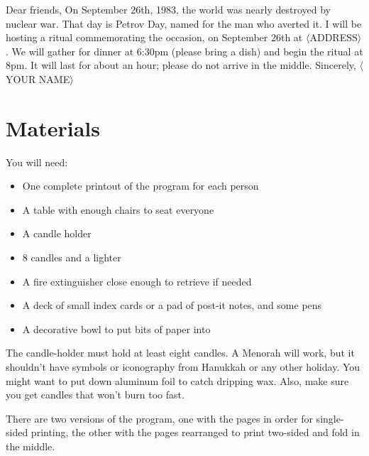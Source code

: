 \documentclass{article}
\begin{document}
\begin{center}
	\parbox{4.5in}{
	Dear friends,\newline
	On September 26th, 1983, the world was nearly destroyed by nuclear war.
	That day is Petrov Day, named for the man who averted it. I will be hosting
	a ritual commemorating the occasion, on September 26th at $\langle$ADDRESS$\rangle$. We
	will gather for dinner at 6:30pm (please bring a dish) and begin the ritual
	at 8pm. It will last for about an hour; please do not arrive in the middle.\newline
	Sincerely,\newline
	$\langle$YOUR NAME$\rangle$}
\end{center}

\section{Materials}
You will need:

\begin{itemize} \itemsep0pt \parskip0pt 
	\item One complete printout of the program for each person
	\item A table with enough chairs to seat everyone
	\item A candle holder
	\item 8 candles and a lighter
	\item A fire extinguisher close enough to retrieve if needed
	\item A deck of small index cards or a pad of post-it notes, and some pens
	\item A decorative bowl to put bits of paper into
\end{itemize}

The candle-holder must hold at least eight candles. A Menorah will work, but it
shouldn't have symbols or iconography from Hanukkah or any other holiday. You
might want to put down aluminum foil to catch dripping wax. Also, make sure you
get candles that won't burn too fast.

There are two versions of the program, one with the pages in order for
single-sided printing, the other with the pages rearranged to print two-sided
and fold in the middle.
\end{document}
